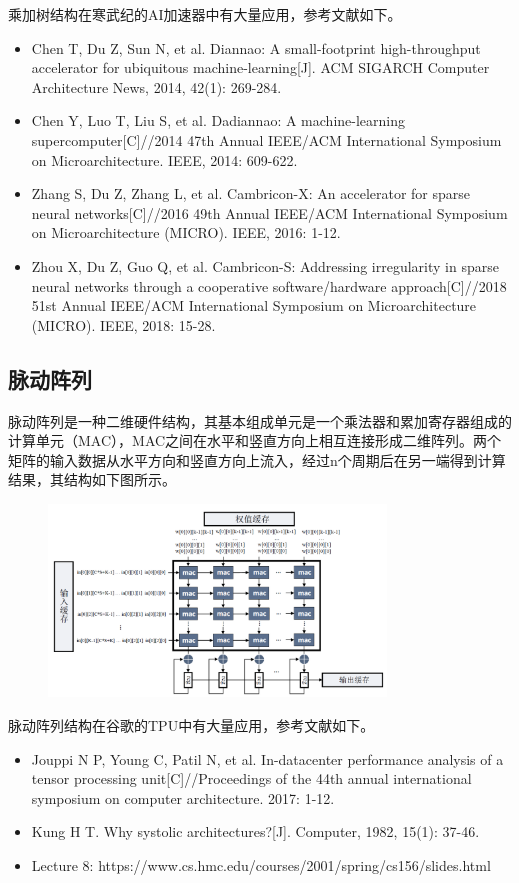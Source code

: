 \documentclass{ctexart}
\begin{document}
乘加树结构在寒武纪的AI加速器中有大量应用，参考文献如下。

\begin{itemize}
    \item Chen T, Du Z, Sun N, et al. Diannao: A small-footprint high-throughput accelerator for ubiquitous machine-learning[J]. ACM SIGARCH Computer Architecture News, 2014, 42(1): 269-284.
    \item Chen Y, Luo T, Liu S, et al. Dadiannao: A machine-learning supercomputer[C]//2014 47th Annual IEEE/ACM International Symposium on Microarchitecture. IEEE, 2014: 609-622.
    \item Zhang S, Du Z, Zhang L, et al. Cambricon-X: An accelerator for sparse neural networks[C]//2016 49th Annual IEEE/ACM International Symposium on Microarchitecture (MICRO). IEEE, 2016: 1-12.
    \item Zhou X, Du Z, Guo Q, et al. Cambricon-S: Addressing irregularity in sparse neural networks through a cooperative software/hardware approach[C]//2018 51st Annual IEEE/ACM International Symposium on Microarchitecture (MICRO). IEEE, 2018: 15-28.
\end{itemize}

\subsection{脉动阵列}
脉动阵列是一种二维硬件结构，其基本组成单元是一个乘法器和累加寄存器组成的计算单元（MAC），MAC之间在水平和竖直方向上相互连接形成二维阵列。两个矩阵的输入数据从水平方向和竖直方向上流入，经过n个周期后在另一端得到计算结果，其结构如下图所示。

\begin{figure}[H]
    \centering
    \includegraphics[width=0.8\textwidth]{lab4/11.png}
\end{figure}

脉动阵列结构在谷歌的TPU中有大量应用，参考文献如下。

\begin{itemize}
    \item Jouppi N P, Young C, Patil N, et al. In-datacenter performance analysis of a tensor processing unit[C]//Proceedings of the 44th annual international symposium on computer architecture. 2017: 1-12.
    \item Kung H T. Why systolic architectures?[J]. Computer, 1982, 15(1): 37-46.
    \item Lecture 8: https://www.cs.hmc.edu/courses/2001/spring/cs156/slides.html
\end{itemize}
\end{document}
